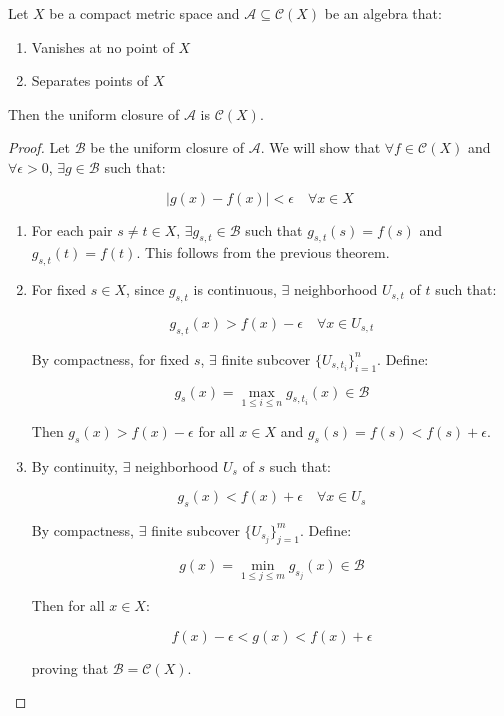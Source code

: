 \documentclass{functionspaces}
\begin{document}
\begin{theorem}
Let $X$ be a compact metric space and $\mathcal{A} \subseteq \mathcal{C}(X)$ be an algebra that:
\begin{enumerate}
\item Vanishes at no point of $X$
\item Separates points of $X$
\end{enumerate}
Then the uniform closure of $\mathcal{A}$ is $\mathcal{C}(X)$.
\end{theorem}

\begin{proof}
Let $\mathcal{B}$ be the uniform closure of $\mathcal{A}$. We will show that $\forall f \in \mathcal{C}(X)$ and $\forall \epsilon > 0$, $\exists g \in \mathcal{B}$ such that:

\[
|g(x) - f(x)| < \epsilon \quad \forall x \in X
\]

\begin{enumerate}
\item For each pair $s \neq t \in X$, $\exists g_{s,t} \in \mathcal{B}$ such that $g_{s,t}(s) = f(s)$ and $g_{s,t}(t) = f(t)$. This follows from the previous theorem.

\item For fixed $s \in X$, since $g_{s,t}$ is continuous, $\exists$ neighborhood $U_{s,t}$ of $t$ such that:

\[
g_{s,t}(x) > f(x) - \epsilon \quad \forall x \in U_{s,t}
\]

By compactness, for fixed $s$, $\exists$ finite subcover $\{U_{s,t_i}\}_{i=1}^n$. Define:

\[
g_s(x) = \max_{1 \leq i \leq n} g_{s,t_i}(x) \in \mathcal{B}
\]

Then $g_s(x) > f(x) - \epsilon$ for all $x \in X$ and $g_s(s) = f(s) < f(s) + \epsilon$.

\item By continuity, $\exists$ neighborhood $U_s$ of $s$ such that:

\[
g_s(x) < f(x) + \epsilon \quad \forall x \in U_s
\]

By compactness, $\exists$ finite subcover $\{U_{s_j}\}_{j=1}^m$. Define:

\[
g(x) = \min_{1 \leq j \leq m} g_{s_j}(x) \in \mathcal{B}
\]

Then for all $x \in X$:

\[
f(x) - \epsilon < g(x) < f(x) + \epsilon
\]

proving that $\mathcal{B} = \mathcal{C}(X)$.
\end{enumerate}
\end{proof}
\end{document}
